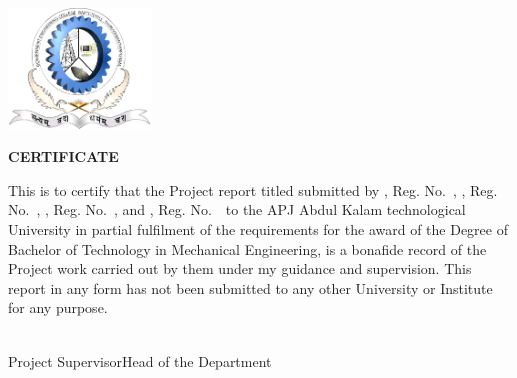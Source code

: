 \onehalfspacing
\thispagestyle{empty}
\parbox[1in]{2in}{ }
\begin{center} \large
\bf{\large \DEPT}\\\vspace{2mm} \BH \\\vspace{5mm} %
\vspace{0.8cm}

\includegraphics[width=1.5in]{./picture-files/gecbs1}

\vspace{5mm}
{\bf CERTIFICATE}


\end{center}

\vspace{0.3cm}
{
\noindent This is to certify that the Project report titled \textbf{\large {\titl}}  submitted by \textbf{{\stone}}, Reg. No.~\RNONE, \textbf{{\sttwo}}, Reg. No.~\RNTWO, \textbf{{\stthree}}, Reg. No.~\RNTHREE, and \textbf{{\stfour}}, Reg. No.~\RNFOUR\ to the APJ Abdul Kalam technological University in partial fulfilment of the requirements for the award of the Degree of Bachelor of Technology in Mechanical Engineering, is a bonafide record of the Project work carried out by them under my guidance and supervision. This report in any form has not been submitted to any other University or Institute for any purpose.
\vspace{0.25in}}

\singlespacing 




\vspace{0.51in}
\begin{center}
 \textbf{\guide} \hfill  \textbf{\hod} 
\\Project Supervisor\hfill Head of the Department 
\end{center}


